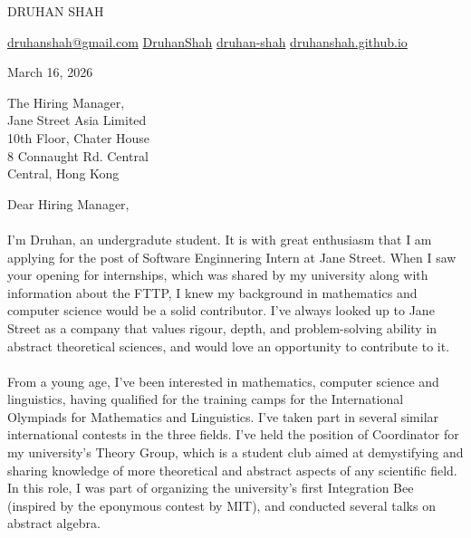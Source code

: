 \documentclass[11pt]{article}
\begin{document}

\begin{center}
  {
    \fontsize{24}{12} 
    \selectfont
    \color{accent} 
    DRUHAN SHAH
  } \\ \medskip

  {
    \fontsize{10}{8}
    \selectfont
    \href{mailto:druhanshah@gmail.com}{{\color{gray}{\faEnvelope}} druhanshah@gmail.com} \quad 
    \href{https://github.com/DruhanShah}{{\color{gray}{\faGithub}} DruhanShah} \quad
    \href{https://www.linkedin.com/in/druhan-shah}{{\color{gray}{\faLinkedin}} druhan-shah} \quad
    \href{https://druhanshah.github.io/}{{\color{gray}{\faLink}} druhanshah.github.io} 
  }
\end{center}


\vspace{0.5cm}
  
\noindent March 16, 2026
\vspace{0.75cm}

\noindent The Hiring Manager, \\
Jane Street Asia Limited \\
10th Floor, Chater House \\
8 Connaught Rd. Central \\
Central, Hong Kong \\
\vspace{0.75cm}

\noindent Dear Hiring Manager,

\paragraph{} I'm Druhan, an undergradute student. It is with great enthusiasm that I am applying for the post of Software Enginnering Intern at Jane Street. When I saw your opening for internships, which was shared by my university along with information about the FTTP, I knew my background in mathematics and computer science would be a solid contributor. I've always looked up to Jane Street as a company that values rigour, depth, and problem-solving ability in abstract theoretical sciences, and would love an opportunity to contribute to it.

\paragraph{} From a young age, I've been interested in mathematics, computer science and linguistics, having qualified for the training camps for the International Olympiads for Mathematics and Linguistics. I've taken part in several similar international contests in the three fields. I've held the position of Coordinator for my university's Theory Group, which is a student club aimed at demystifying and sharing knowledge of more theoretical and abstract aspects of any scientific field. In this role, I was part of organizing the university's first Integration Bee (inspired by the eponymous contest by MIT), and conducted several talks on abstract algebra.
\end{document}
